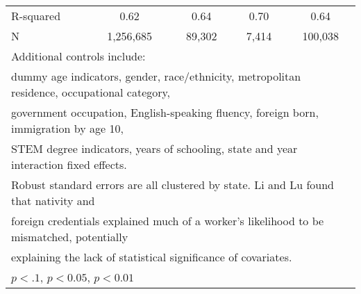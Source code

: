 \begin{table}[htbp]
\begin{tabular}{l*{4}{c}}
R-squared           &        0.62         &        0.64         &        0.70         &        0.64         \\
N                   &   1,256,685         &      89,302         &       7,414         &     100,038         \\
\bottomrule
\multicolumn{5}{l}{\footnotesize Additional controls include:}\\
\multicolumn{5}{l}{\footnotesize dummy age indicators, gender, race/ethnicity, metropolitan residence, occupational category,}\\
\multicolumn{5}{l}{\footnotesize government occupation, English-speaking fluency, foreign born, immigration by age 10,}\\
\multicolumn{5}{l}{\footnotesize STEM degree indicators, years of schooling, state and year interaction fixed effects.}\\
\multicolumn{5}{l}{\footnotesize Robust standard errors are all clustered by state. Li and Lu found that nativity and}\\
\multicolumn{5}{l}{\footnotesize foreign credentials explained much of a worker's likelihood to be mismatched, potentially}\\
\multicolumn{5}{l}{\footnotesize explaining the lack of statistical significance of covariates.}\\
\multicolumn{5}{l}{\footnotesize \sym{*} \(p<.1\), \sym{**} \(p<0.05\), \sym{***} \(p<0.01\)}\\
\end{tabular}
\end{table}
